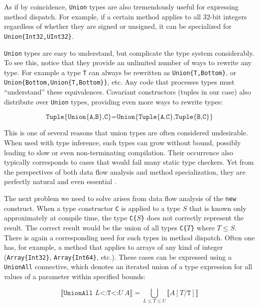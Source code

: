 As if by coincidence, \texttt{Union} types are also tremendously useful for expressing
method dispatch.
For example, if a certain method applies to all 32-bit integers regardless
of whether they are signed or unsigned, it can be specialized for \texttt{Union\{Int32,UInt32\}}.

\texttt{Union} types are easy to understand, but complicate the type system considerably.
To see this, notice that they provide an unlimited number of ways to rewrite any type.
For example a type \texttt{T} can always be rewritten as \texttt{Union\{T,Bottom\}}, or
\texttt{Union\{Bottom,Union\{T,Bottom\}\}}, etc.
Any code that processes types must ``understand'' these equivalences.
Covariant constructors (tuples in our case) also distribute over \texttt{Union} types,
providing even more ways to rewrite types:

\vspace{-3ex}
\[
\texttt{Tuple\{Union\{A,B\},C\}} = \texttt{Union\{Tuple\{A,C\},Tuple\{B,C\}\}}
\]

This is one of several reasons that union types are often considered undesirable.
When used with type inference, such types can grow without bound, possibly leading
to slow or even non-terminating compilation.
Their occurrence also typically corresponds to cases that would fail many static type
checkers.
Yet from the perspectives of both data flow analysis and method specialization, they
are perfectly natural and even essential
\cite{abstractinterp, Igarashi, Smith:2008:JTI:1449764.1449804}.

The next problem we need to solve arises from data flow analysis of
the \texttt{new} construct.
When a type constructor \texttt{C} is applied to a type
$S$ that is known only approximately at compile time, the type \texttt{C\{}$S$\texttt{\}}
does not correctly represent the result.
The correct result would be the union of all types \texttt{C\{}$T$\texttt{\}}
where $T\leq S$.
There is again a corresponding need for such types in method dispatch.
Often one has, for example, a method that applies to arrays of any
kind of integer (\texttt{Array\{Int32\}}, \texttt{Array\{Int64\}}, etc.).
These cases can be expressed using a \texttt{UnionAll} connective, which denotes
an iterated union of a type expression for all values of a parameter within
specified bounds:

\vspace{-3ex}
\[
  \llbracket \texttt{UnionAll }L\texttt{<:T<:}U\ A \rrbracket = \bigcup_{L \leq T \leq U} \llbracket A[T/\texttt{T}] \rrbracket
\]

